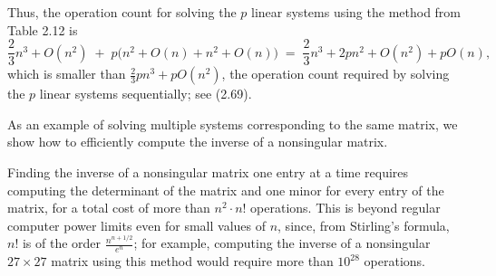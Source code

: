 
\begin{table}[H]
\centering
\caption{Solution of multiple linear systems corresponding to the same matrix}
\end{table}

Thus, the operation count for solving the $p$ linear systems using the method from
Table 2.12 is
\[
\frac23n^3+O(n^2) \;+\; p\bigl(n^2+O(n)+n^2+O(n)\bigr) \;=\;
\frac23n^3+2pn^2+O(n^2)+pO(n),
\]
which is smaller than $\frac23pn^3+pO(n^2)$, the operation count required by solving
the $p$ linear systems sequentially; see (2.69).

As an example of solving multiple systems corresponding to the same matrix, we show
how to efficiently compute the inverse of a nonsingular matrix.

Finding the inverse of a nonsingular matrix one entry at a time requires computing
the determinant of the matrix and one minor for every entry of the matrix, for a
total cost of more than $n^2\cdot n!$ operations. This is beyond regular computer
power limits even for small values of $n$, since, from Stirling's formula, $n!$ is
of the order $\frac{n^{n+1/2}}{e^n}$; for example, computing the inverse of a
nonsingular $27\times27$ matrix using this method would require more than $10^{28}$
operations.

